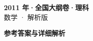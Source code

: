 \documentclass[zihao=-4, a4paper]{ctexart}
\begin{document}
\begin{center}
  {\Large\bfseries 2011 年·全国大纲卷·理科}\\[4pt]
  {\large 数学 · 解析版}
\end{center}
\medskip
{}

\clearpage
{}
\begin{center}{\Large\bfseries 参考答案与详细解析}\end{center}
\medskip

\end{document}
